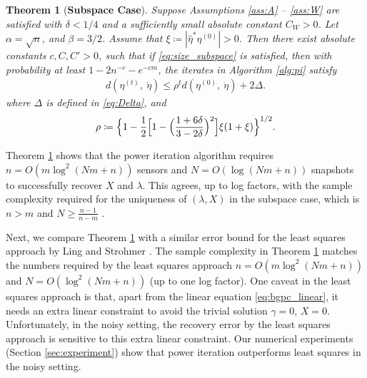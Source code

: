 \documentclass[11pt,journal]{IEEEtran}
\newtheorem{theorem}{Theorem}[section]
\begin{document}
\begin{theorem}[\textbf{Subspace Case}] \label{thm:pi}
Suppose Assumptions \ref{ass:A} -- \ref{ass:W} are satisfied with $\delta < 1/4$ and a sufficiently small absolute constant $C_W > 0$. Let $\alpha =\sqrt{n}$, and $\beta = 3/2$. Assume that $\xi \coloneqq |\hat{\eta}^*\eta^{(0)}| > 0$. Then there exist absolute constants $c,C,C' > 0$, such that if \eqref{eq:size_subspace} is satisfied, then with probability at least $1-2n^{-c} - e^{-cm}$, the iterates in Algorithm \ref{alg:pi} satisfy
\begin{align*}
d(\eta^{(t)},~\dot{\eta}) \leq \rho^t
d(\eta^{(0)},~\dot{\eta}) + 2\Delta.
\end{align*}
where $\Delta$ is defined in \eqref{eq:Delta}, and
\begin{equation}
\label{eq:rho}
\rho \coloneqq \Bigl\{ 1 - \frac{1}{2} \Bigl[1-\Bigl(\frac{1+6\delta}{3-2\delta}\Bigr)^2\Bigr]\xi(1 + \xi) \Bigr\}^{1/2}.
\end{equation}
\end{theorem}

Theorem \ref{thm:pi} shows that the power iteration algorithm requires $n=O(m\log^2(Nm+n))$ sensors and $N=O(\log(Nm+n))$ snapshots to successfully recover $X$ and $\lambda$. This agrees, up to log factors, with the sample complexity required for the uniqueness of $(\lambda, X)$ in the subspace case, which is $n>m$ and $N\geq \frac{n-1}{n-m}$ \cite{Li2015e}.

Next, we compare Theorem \ref{thm:pi} with a similar error bound for the least squares approach by Ling and Strohmer \cite[Theorem 3.5]{Ling2016}. The sample complexity in Theorem \ref{thm:pi} matches the numbers required by the least squares approach $n=O(m\log^2(Nm+n))$ and $N=O(\log^2(Nm+n))$ (up to one log factor). One caveat in the least squares approach is that, apart from the linear equation \eqref{eq:bgpc_linear}, it needs an extra linear constraint to avoid the trivial solution $\gamma=0$, $X=0$. Unfortunately, in the noisy setting, the recovery error by the least squares approach is sensitive to this extra linear constraint. Our numerical experiments (Section \ref{sec:experiment}) show that power iteration outperforms least squares in the noisy setting.


\end{document}
